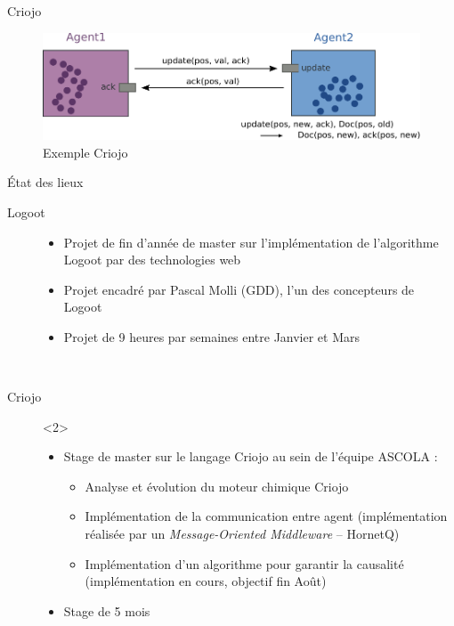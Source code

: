 \begin{frame}{Criojo}
\begin{figure}
  \center
  \includegraphics[width=.9\textwidth]{includes/criojo.pdf}
  \caption{Exemple Criojo}
\end{figure}
\end{frame}

\begin{frame}{État des lieux}
\begin{description}
  \item [Logoot]
  \begin{itemize}
    \item Projet de fin d'année de master sur l'implémentation de l'algorithme
    Logoot par des technologies web
    \item Projet encadré par Pascal Molli (GDD), l'un des concepteurs de Logoot
    \item Projet de 9 heures par semaines entre Janvier et Mars
  \end{itemize}~
  \item [Criojo]<2>
  \begin{itemize} 
    \item Stage de master sur le langage Criojo au sein de l'équipe ASCOLA :
    \begin{itemize} 
      \item Analyse et évolution du moteur chimique Criojo
      \item Implémentation de la communication entre agent (implémentation
      réalisée par un \emph{Message-Oriented Middleware} -- HornetQ)
      \item Implémentation d'un algorithme pour garantir la causalité
      (implémentation en cours, objectif fin Août) 
    \end{itemize}
    \item Stage de 5 mois
  \end{itemize}
\end{description}
\end{frame}

